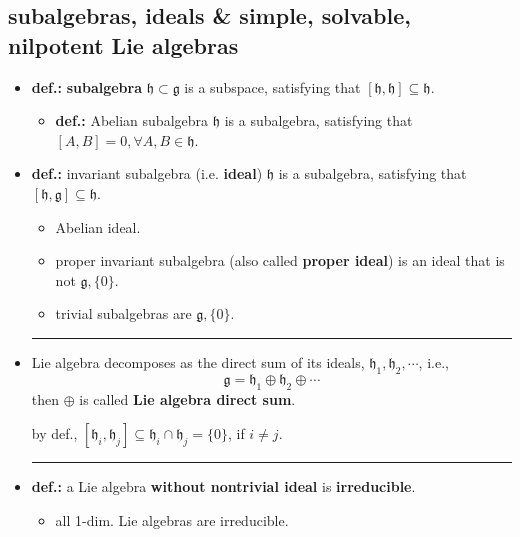 \subsection{subalgebras, ideals \& simple, solvable, nilpotent Lie algebras} \label{3.2.1}
\begin{itemize}
	\item \textbf{def.:} \textbf{subalgebra} $\mathfrak{h} \subset \mathfrak{g}$ is a subspace, satisfying that $[\mathfrak{h}, \mathfrak{h}] \subseteq \mathfrak{h}$.
	\begin{itemize}
		\item \textbf{def.:} Abelian subalgebra $\mathfrak{h}$ is a subalgebra, satisfying that $[A, B] = 0, \forall A, B \in \mathfrak{h}$.
	\end{itemize}
	
	\item \textbf{def.:} invariant subalgebra (i.e. \textbf{ideal}) $\mathfrak{h}$ is a subalgebra, satisfying that $[\mathfrak{h}, \mathfrak{g}] \subseteq \mathfrak{h}$.
	\begin{itemize}
		\item Abelian ideal.
		
		\item proper invariant subalgebra (also called \textbf{proper ideal}) is an ideal that is not $\mathfrak{g}, \{0\}$.
		
		\item trivial subalgebras are $\mathfrak{g}, \{0\}$.
	\end{itemize}
	
	\noindent\rule[0.5ex]{\linewidth}{0.5pt} %
	
	\item Lie algebra decomposes as the direct sum of its ideals, $\mathfrak{h}_1, \mathfrak{h}_2, \cdots$, i.e.,
	\begin{equation}
		\mathfrak{g} = \mathfrak{h}_1 \oplus \mathfrak{h}_2 \oplus \cdots
	\end{equation}
	then $\oplus$ is called \textbf{Lie algebra direct sum}.
	
	\begin{tcolorbox}[title=proof:]
		by def., $[\mathfrak{h}_i, \mathfrak{h}_j] \subseteq \mathfrak{h}_i \cap \mathfrak{h}_j = \{0\}$, if $i \neq j$.
	\end{tcolorbox}
	
	\noindent\rule[0.5ex]{\linewidth}{0.5pt} %
	
	\item \textbf{def.:} a Lie algebra \textbf{without nontrivial ideal} is \textbf{irreducible}.
	\begin{itemize}
		\item all 1-dim. Lie algebras are irreducible.
	\end{itemize}
	

\end{itemize}
